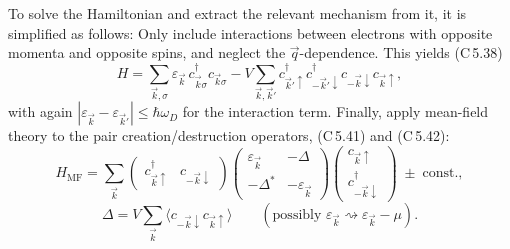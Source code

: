 \documentclass[../../main.tex]{subfiles}
\begin{document}
To solve the Hamiltonian and extract the relevant mechanism from it, it is simplified as
follows: Only include interactions between electrons with opposite momenta and opposite
spins, and neglect the $\vec q$-dependence. This yields (C\,5.38)
\begin{equation}
H = \sum_{\vec k,\sigma}\varepsilon_{\vec k}\,c^\dagger_{\vec k\sigma}c_{\vec k\sigma}
  - V\sum_{\vec k,\vec k'}
    c^\dagger_{\vec k'\uparrow}c^\dagger_{-\vec k'\downarrow}
    c_{-\vec k\downarrow}c_{\vec k\uparrow},
\label{eq:bcs-hamiltonian}
\end{equation}
with again $|\varepsilon_{\vec k}-\varepsilon_{\vec k'}|\le\hbar\omega_D$ for
the interaction term. Finally, apply mean-field theory to the pair
creation/destruction operators, (C\,5.41) and (C\,5.42):
\begin{equation}
H_{\mathrm{MF}} = \sum_{\vec k}
  \begin{pmatrix}c^\dagger_{\vec k\uparrow}&c_{-\vec k\downarrow}\end{pmatrix}
  \begin{pmatrix}
    \varepsilon_{\vec k} & -\Delta\\
    -\Delta^* & -\varepsilon_{\vec k}
  \end{pmatrix}
  \begin{pmatrix}c_{\vec k\uparrow}\\c^\dagger_{-\vec k\downarrow}\end{pmatrix}
  \;\pm\;\mathrm{const.},
\label{eq:h-mf}
\end{equation}
\begin{equation}
\Delta = V\sum_{\vec k}\langle c_{-\vec k\downarrow}c_{\vec k\uparrow}\rangle
\qquad(\text{possibly }\varepsilon_{\vec k}\rightsquigarrow\varepsilon_{\vec k}-\mu).
\label{eq:gap-def}
\end{equation}
\end{document}
